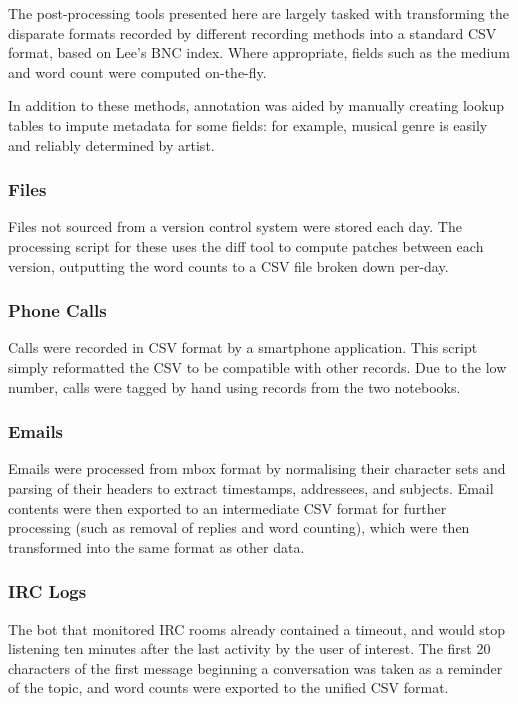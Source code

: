 

The post-processing tools presented here are largely tasked with transforming the disparate formats recorded by different recording methods into a standard CSV format, based on Lee's BNC index.  Where appropriate, fields such as the medium and word count were computed on-the-fly.

In addition to these methods, annotation was aided by manually creating lookup tables to impute metadata for some fields: for example, musical genre is easily and reliably determined by artist.


\subsubsection*{Files}

Files not sourced from a version control system were stored each day.  The processing script for these uses the diff tool to compute patches between each version, outputting the word counts to a CSV file broken down per-day.

\subsubsection*{Phone Calls}
Calls were recorded in CSV format by a smartphone application.  This script simply reformatted the CSV to be compatible with other records.  Due to the low number, calls were tagged by hand using records from the two notebooks.


\subsubsection*{Emails}
Emails were processed from mbox format by normalising their character sets and parsing of their headers to extract timestamps, addressees, and subjects.  Email contents were then exported to an intermediate CSV format for further processing (such as removal of replies and word counting), which were then transformed into the same format as other data.



\subsubsection*{IRC Logs}
The bot that monitored IRC rooms already contained a timeout, and would stop listening ten minutes after the last activity by the user of interest.  The first 20 characters of the first message beginning a conversation was taken as a reminder of the topic, and word counts were exported to the unified CSV format.


